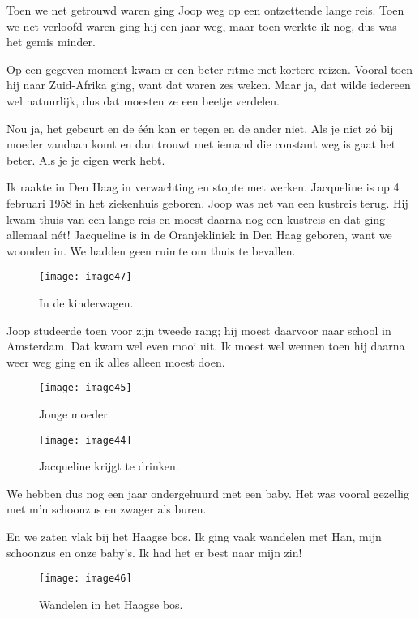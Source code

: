 Toen we net getrouwd waren ging Joop weg op een ontzettende lange reis. Toen we net verloofd waren ging hij een jaar weg, maar toen werkte ik nog, dus was het gemis minder. 

Op een gegeven moment kwam er een beter ritme met kortere reizen. Vooral toen hij naar Zuid-Afrika ging, want dat waren zes weken. Maar ja, dat wilde iedereen wel natuurlijk, dus dat moesten ze een beetje verdelen. 

Nou ja, het gebeurt en de \'{e}\'{e}n kan er tegen en de ander niet. Als je niet z\'{o} bij moeder vandaan komt en dan trouwt met iemand die constant weg is gaat het beter. Als je je eigen werk hebt.

Ik raakte in Den Haag in verwachting en stopte met werken. Jacqueline is op 4 februari 1958 in het ziekenhuis geboren. Joop was net van een kustreis terug. Hij kwam thuis van een lange reis en moest daarna nog een kustreis en dat ging allemaal n\'{e}t! Jacqueline is in de Oranjekliniek in Den Haag geboren, want we woonden in. We hadden geen ruimte om thuis te bevallen.

\begin{figure}[h]
    \texttt{[image: image47]}
    \caption{In de kinderwagen.}
\end{figure}

Joop studeerde toen voor zijn tweede rang; hij moest daarvoor naar school in Amsterdam. Dat kwam wel even mooi uit. Ik moest wel wennen toen hij daarna weer weg ging en ik alles alleen moest doen.

\begin{figure}[h]
    \texttt{[image: image45]}
    \caption{Jonge moeder.}
\end{figure}

\begin{figure}[h]
    \texttt{[image: image44]}
    \caption{Jacqueline krijgt te drinken.}
\end{figure}

We hebben dus nog een jaar ondergehuurd met een baby. Het was vooral gezellig met m’n schoonzus en zwager als buren. 

En we zaten vlak bij het Haagse bos. Ik ging vaak wandelen met Han, mijn schoonzus en onze baby’s. Ik had het er best naar mijn zin!

\begin{figure}[h]
    \texttt{[image: image46]}
    \caption{Wandelen in het Haagse bos.}
\end{figure}

